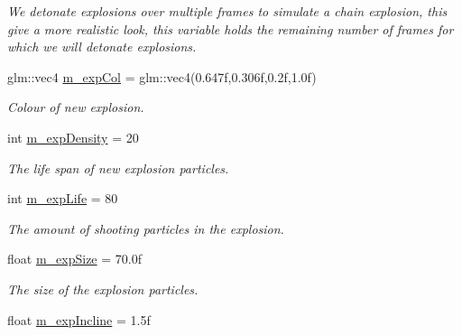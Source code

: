 \begin{DoxyCompactItemize}
\begin{DoxyCompactList}\small\item\em We detonate explosions over multiple frames to simulate a chain explosion, this give a more realistic look, this variable holds the remaining number of frames for which we will detonate explosions. \end{DoxyCompactList}\item 
\hypertarget{classEmitter_a2fb204e6cb07011468d7603f7aa8bce7}{glm\-::vec4 \hyperlink{classEmitter_a2fb204e6cb07011468d7603f7aa8bce7}{m\-\_\-exp\-Col} = glm\-::vec4(0.\-647f,0.\-306f,0.\-2f,1.\-0f)}\label{classEmitter_a2fb204e6cb07011468d7603f7aa8bce7}

\begin{DoxyCompactList}\small\item\em Colour of new explosion. \end{DoxyCompactList}\item 
\hypertarget{classEmitter_a0e8ab9310a04b5860722e3cb953642e6}{int \hyperlink{classEmitter_a0e8ab9310a04b5860722e3cb953642e6}{m\-\_\-exp\-Density} = 20}\label{classEmitter_a0e8ab9310a04b5860722e3cb953642e6}

\begin{DoxyCompactList}\small\item\em The life span of new explosion particles. \end{DoxyCompactList}\item 
\hypertarget{classEmitter_afc994081ef53be0a63ef421697844524}{int \hyperlink{classEmitter_afc994081ef53be0a63ef421697844524}{m\-\_\-exp\-Life} = 80}\label{classEmitter_afc994081ef53be0a63ef421697844524}

\begin{DoxyCompactList}\small\item\em The amount of shooting particles in the explosion. \end{DoxyCompactList}\item 
\hypertarget{classEmitter_a9698c6471e3d28a10c6210ecd2804f3d}{float \hyperlink{classEmitter_a9698c6471e3d28a10c6210ecd2804f3d}{m\-\_\-exp\-Size} = 70.\-0f}\label{classEmitter_a9698c6471e3d28a10c6210ecd2804f3d}

\begin{DoxyCompactList}\small\item\em The size of the explosion particles. \end{DoxyCompactList}\item 
\hypertarget{classEmitter_adf82b76b44887e822b839e580894a622}{float \hyperlink{classEmitter_adf82b76b44887e822b839e580894a622}{m\-\_\-exp\-Incline} = 1.\-5f}\label{classEmitter_adf82b76b44887e822b839e580894a622}


\end{DoxyCompactItemize}
